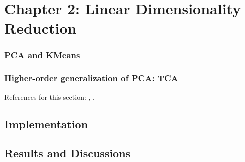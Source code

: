 \chapter{Chapter 2: Linear Dimensionality Reduction} 
\label{Chapter2} 

\subsection{PCA and KMeans}

\subsection{Higher-order generalization of PCA: TCA}
References for this section: \cite{kolda_tensor_2009}, \cite{hong_generalized_2020}.

\section{Implementation}

\section{Results and Discussions}